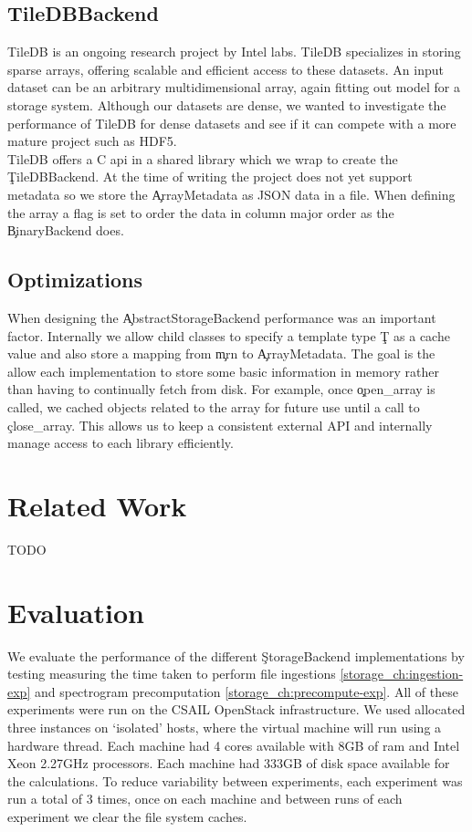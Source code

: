 \subsection{TileDBBackend}

TileDB\cite{tiledb} is an ongoing research project by Intel labs. TileDB
specializes in storing sparse arrays, offering scalable and efficient access to
these datasets. An input dataset can be an arbitrary multidimensional array,
again fitting out model for a storage system. Although our datasets are dense,
we wanted to investigate the performance of TileDB for dense datasets and see
if it can compete with a more mature project such as HDF5.\\

TileDB offers a C api in a shared library which we wrap to create the
\c{TileDBBackend}. At the time of writing the project does not yet support
metadata so we store the \c{ArrayMetadata} as JSON data in a file. When
defining the array a flag is set to order the data in column major order as the
\c{BinaryBackend} does.

\subsection{Optimizations}\label{storage_ch:opt}

When designing the \c{AbstractStorageBackend} performance was an important
factor. Internally we allow child classes to specify a template type \c{T} as
a cache value and also store a mapping from \c{mrn} to \c{ArrayMetadata}. The
goal is the allow each implementation to store some basic information in memory
rather than having to continually fetch from disk. For example, once
\c{open\_array} is called, we cached objects related to the array for future
use until a call to \c{close\_array}. This allows us to keep a consistent
external API and internally manage access to each library efficiently.

\section{Related Work}
TODO

\section{Evaluation}\label{storage_ch:evaluation}

We evaluate the performance of the different \c{StorageBackend} implementations
by testing measuring the time taken to perform file ingestions
\ref{storage_ch:ingestion-exp} and spectrogram precomputation
\ref{storage_ch:precompute-exp}. All of these experiments were run on the CSAIL
OpenStack infrastructure. We used allocated three instances on `isolated'
hosts, where the virtual machine will run using a hardware thread. Each machine
had 4 cores available with 8GB of ram and Intel Xeon 2.27GHz processors. Each
machine had 333GB of disk space available for the calculations. To reduce
variability between experiments, each experiment was run a total of 3 times,
once on each machine and between runs of each experiment we clear the file
system caches.\\

